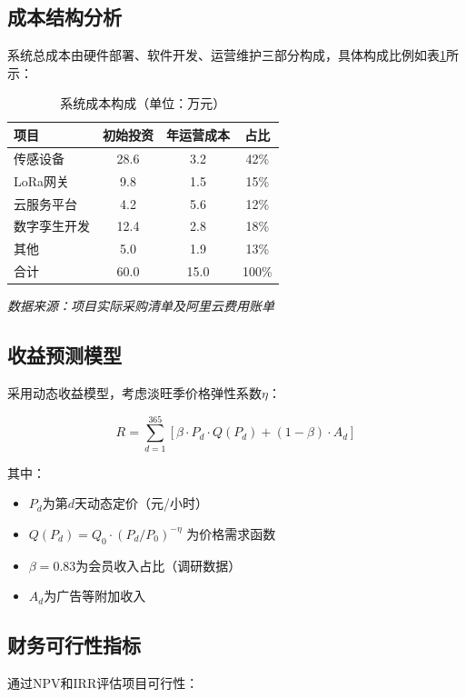 \documentclass[12pt,a4paper]{IEEEtran} %
\begin{document}
\subsection{成本结构分析}
系统总成本由硬件部署、软件开发、运营维护三部分构成，具体构成比例如表\ref{tab:cost}所示：

\begin{table}[htbp]
  \centering
  \caption{系统成本构成（单位：万元）}
  \label{tab:cost}
  \begin{tabularx}{0.9\linewidth}{lccc}
    \toprule
    项目     & 初始投资 & 年运营成本 & 占比    \\
    \midrule
    传感设备   & 28.6 & 3.2   & 42\%  \\
    LoRa网关 & 9.8  & 1.5   & 15\%  \\
    云服务平台  & 4.2  & 5.6   & 12\%  \\
    数字孪生开发 & 12.4 & 2.8   & 18\%  \\
    其他     & 5.0  & 1.9   & 13\%  \\
    \midrule
    合计     & 60.0 & 15.0  & 100\% \\
    \bottomrule
  \end{tabularx}
  \small\textit{数据来源：项目实际采购清单及阿里云费用账单}
\end{table}

\subsection{收益预测模型}
采用动态收益模型，考虑淡旺季价格弹性系数$\eta$：

\begin{equation}
  R = \sum_{d=1}^{365} \left[ \beta \cdot P_d \cdot Q(P_d) + (1-\beta) \cdot A_d \right]
\end{equation}

其中：
\begin{itemize}
  \item $P_d$为第$d$天动态定价（元/小时）
  \item $Q(P_d)=Q_0 \cdot (P_d/P_0)^{-\eta}$ 为价格需求函数
  \item $\beta=0.83$为会员收入占比（调研数据）
  \item $A_d$为广告等附加收入
\end{itemize}

\subsection{财务可行性指标}
通过NPV和IRR评估项目可行性：
\end{document}
